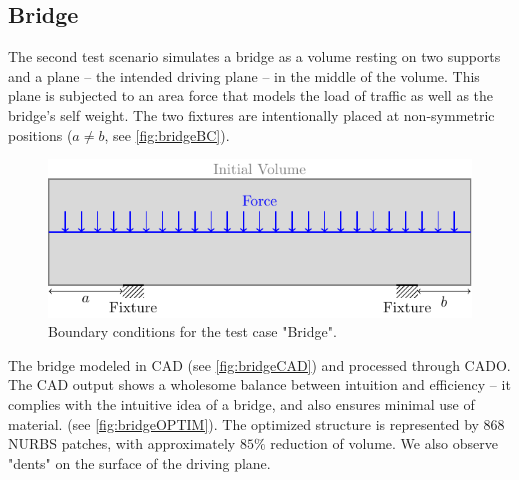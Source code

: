 \subsection{Bridge}
The second test scenario simulates a bridge as a volume resting on two supports and a plane -- the intended driving plane -- in the middle of the volume. This plane is subjected to an area force that models the load of traffic as well as the bridge's self weight. The two fixtures are intentionally placed at non-symmetric positions ($a\neq b$, see \autoref{fig:bridgeBC}).
\label{ssec:bridge}
\begin{figure}[H]
\begin{center}
\includegraphics[scale=0.8]{Pictures/tikzBridge/bridge.pdf}
\end{center}
\caption{Boundary conditions for the test case "Bridge".}
\label{fig:bridgeBC}
\end{figure}
The bridge modeled in CAD (see \autoref{fig:bridgeCAD}) and processed through CADO. The CAD output shows a wholesome balance between intuition and efficiency -- it complies with the intuitive idea of a bridge, and also ensures minimal use of material. (see \autoref{fig:bridgeOPTIM}). The optimized structure is represented by $868$ NURBS patches, with approximately $85\%$ reduction of volume. We also observe "dents" on the surface of the driving plane.
